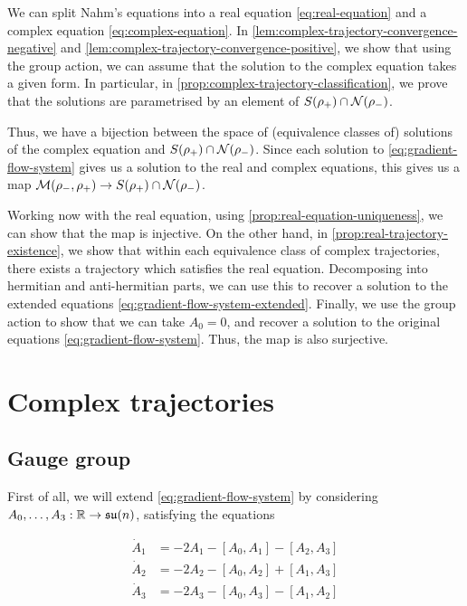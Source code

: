 \documentclass{report}
\newcommand{\su}{\mathfrak{su}}
\begin{document}
We can split Nahm's equations into a real equation \cref{eq:real-equation} and a complex equation \cref{eq:complex-equation}. In \cref{lem:complex-trajectory-convergence-negative} and \cref{lem:complex-trajectory-convergence-positive}, we show that using the group action, we can assume that the solution to the complex equation takes a given form. In particular, in \cref{prop:complex-trajectory-classification}, we prove that the solutions are parametrised by an element of \(S(\rho_+) \cap \mathcal{N}(\rho_-)\).

Thus, we have a bijection between the space of (equivalence classes of) solutions of the complex equation and \(S(\rho_+) \cap \mathcal{N}(\rho_-)\). Since each solution to \cref{eq:gradient-flow-system} gives us a solution to the real and complex equations, this gives us a map \(\mathcal{M}(\rho_-, \rho_+) \to S(\rho_+) \cap \mathcal{N}(\rho_-)\).

Working now with the real equation, using \cref{prop:real-equation-uniqueness}, we can show that the map is injective. On the other hand, in \cref{prop:real-trajectory-existence}, we show that within each equivalence class of complex trajectories, there exists a trajectory which satisfies the real equation. Decomposing into hermitian and anti-hermitian parts, we can use this to recover a solution to the extended equations \cref{eq:gradient-flow-system-extended}. Finally, we use the group action to show that we can take \(A_0 = 0\), and recover a solution to the original equations \cref{eq:gradient-flow-system}. Thus, the map is also surjective.

\section{Complex trajectories}

\subsection{Gauge group}

First of all, we will extend \cref{eq:gradient-flow-system} by considering \(A_0, \dots, A_3 : \R \to \su(n)\), satisfying the equations

\begin{equation}
    \label{eq:gradient-flow-system-extended}
    \begin{split}
        \dot A_1 &= -2A_1 - [A_0, A_1] - [A_2, A_3] \\
        \dot A_2 &= -2A_2 - [A_0, A_2] + [A_1, A_3] \\
        \dot A_3 &= -2A_3 - [A_0, A_3] - [A_1, A_2] \\
    \end{split}
\end{equation}
\end{document}
